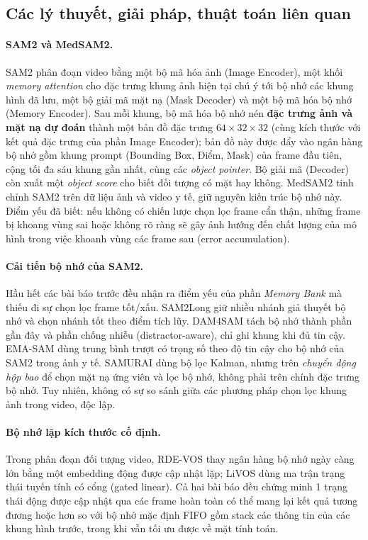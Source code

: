 \documentclass[a4paper,12pt]{report}
\begin{document}
\subsection{Các lý thuyết, giải pháp, thuật toán liên quan}

\paragraph{SAM2 và MedSAM2.} SAM2 \cite{sam2} phân đoạn video bằng một bộ mã hóa ảnh (Image Encoder), một khối \emph{memory attention} cho đặc trưng khung ảnh hiện tại chú ý tới bộ nhớ các khung hình đã lưu, một bộ giải mã mặt nạ (Mask Decoder) và một bộ mã hóa bộ nhớ (Memory Encoder). Sau mỗi khung, bộ mã hóa bộ nhớ nén \textbf{đặc trưng ảnh và mặt nạ dự đoán} thành một bản đồ đặc trưng $64\times 32\times 32$ (cùng kích thước với kết quả đặc trưng của phần Image Encoder); bản đồ này được đẩy vào ngân hàng bộ nhớ gồm khung prompt (Bounding Box, Điểm, Mask) của frame đầu tiên, cộng tối đa sáu khung gần nhất, cùng các \emph{object pointer}. Bộ giải mã (Decoder) còn xuất một \emph{object score} cho biết đối tượng có mặt hay không. MedSAM2 \cite{medsam2} tinh chỉnh SAM2 trên dữ liệu ảnh và video y tế, giữ nguyên kiến trúc bộ nhớ này. Điểm yếu đã biết: nếu không có chiến lược chọn lọc frame cẩn thận, những frame bị khoang vùng sai hoặc không rõ ràng sẽ gây ảnh hướng đến chất lượng của mô hình trong việc khoanh vùng các frame sau (error accumulation).

\paragraph{Cải tiến bộ nhớ của SAM2.} Hầu hết các bài báo trước đều nhận ra điểm yếu của phần \emph{Memory Bank} mà thiếu đi sự chọn lọc frame tốt/xấu. SAM2Long \cite{sam2long} giữ nhiều nhánh giả thuyết bộ nhớ và chọn nhánh tốt theo điểm tích lũy. DAM4SAM \cite{dam4sam} tách bộ nhớ thành phần gần đây và phần chống nhiễu (distractor-aware), chỉ ghi khung khi đủ tin cậy. EMA-SAM \cite{emasam} dùng trung bình trượt có trọng số theo độ tin cậy cho bộ nhớ của SAM2 trong ảnh y tế. SAMURAI \cite{samurai} dùng bộ lọc Kalman, nhưng trên \emph{chuyển động hộp bao} để chọn mặt nạ ứng viên và lọc bộ nhớ, không phải trên chính đặc trưng bộ nhớ. Tuy nhiên, không có sự so sánh giữa các phương pháp chọn lọc khung ảnh trong video, độc lập.

\paragraph{Bộ nhớ lặp kích thước cố định.} Trong phân đoạn đối tượng video, RDE-VOS \cite{rdevos} thay ngân hàng bộ nhớ ngày càng lớn bằng một embedding động được cập nhật lặp; LiVOS \cite{livos} dùng ma trận trạng thái tuyến tính có cổng (gated linear). Cả hai bài báo đều chứng minh 1 trạng thái động được cập nhật qua các frame hoàn toàn có thể mang lại kết quả tương đương hoặc hơn so với bộ nhớ mặc định FIFO gồm stack các thông tin của các khung hình trước, trong khi vẫn tối ưu được về mặt tính toán.
\end{document}
